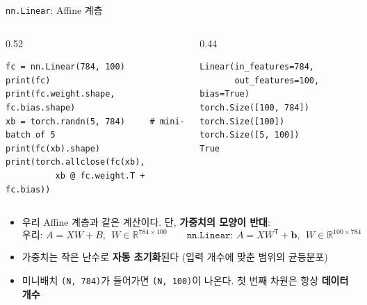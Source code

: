\documentclass[aspectratio=169,11pt]{beamer}
\newcommand{\R}{\mathbb{R}}
\newcommand{\vect}[1]{\bm{#1}}
\newcommand{\T}{^{\mathsf T}}
\newcommand{\code}[1]{\texttt{#1}}
\begin{document}
\begin{frame}[fragile]{\code{nn.Linear}: Affine 계층}
\begin{columns}[T,onlytextwidth]
\begin{column}{0.52\textwidth}
\begin{lstlisting}
fc = nn.Linear(784, 100)
print(fc)
print(fc.weight.shape, fc.bias.shape)
xb = torch.randn(5, 784)     # mini-batch of 5
print(fc(xb).shape)
print(torch.allclose(fc(xb),
          xb @ fc.weight.T + fc.bias))
\end{lstlisting}
\end{column}
\begin{column}{0.44\textwidth}
\begin{lstlisting}[style=outstyle]
Linear(in_features=784,
       out_features=100, bias=True)
torch.Size([100, 784]) torch.Size([100])
torch.Size([5, 100])
True
\end{lstlisting}
\end{column}
\end{columns}
\vskip2mm
\begin{itemize}
\item 우리 Affine 계층과 같은 계산이다. 단, \textbf{가중치의 모양이 반대}:
\[
\text{우리: } A = XW + B,\ \ W\in\R^{784\times100}
\qquad
\code{nn.Linear}\text{: } A = XW\T + \vect b,\ \ W\in\R^{100\times784}
\]
\item 가중치는 작은 난수로 \textbf{자동 초기화}된다 (입력 개수에 맞춘 범위의 균등분포)
\item 미니배치 \code{(N, 784)}가 들어가면 \code{(N, 100)}이 나온다. 첫 번째 차원은 항상 \textbf{데이터 개수}
\end{itemize}
\end{frame}
\end{document}

